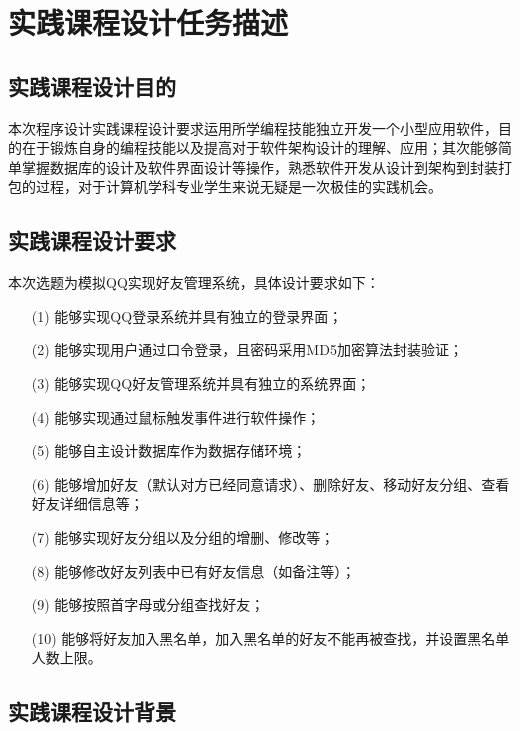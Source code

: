 \documentclass{progartcn}
\begin{document}
\clearpage
\thispagestyle{empty}
\tableofcontents  %
\newpage


\section{实践课程设计任务描述}
\subsection{实践课程设计目的}
本次程序设计实践课程设计要求运用所学编程技能独立开发一个小型应用软件，目的在于锻炼自身的编程技能以及提高对于软件架构设计的理解、应用；其次能够简单掌握数据库的设计及软件界面设计等操作，熟悉软件开发从设计到架构到封装打包的过程，对于计算机学科专业学生来说无疑是一次极佳的实践机会。

\subsection{实践课程设计要求}

本次选题为模拟QQ实现好友管理系统，具体设计要求如下：
\begin{enumerate}[itemsep=0.01pt]
	\item[(1)] 能够实现QQ登录系统并具有独立的登录界面；
	\item[(2)] 能够实现用户通过口令登录，且密码采用MD5加密算法封装验证；
	\item[(3)] 能够实现QQ好友管理系统并具有独立的系统界面；
	\item[(4)] 能够实现通过鼠标触发事件进行软件操作；
	\item[(5)] 能够自主设计数据库作为数据存储环境；
	\item[(6)] 能够增加好友（默认对方已经同意请求）、删除好友、移动好友分组、查看好友详细信息等；
	\item[(7)] 能够实现好友分组以及分组的增删、修改等；
	\item[(8)] 能够修改好友列表中已有好友信息（如备注等）；
	\item[(9)] 能够按照首字母或分组查找好友；
	\item[(10)] 能够将好友加入黑名单，加入黑名单的好友不能再被查找，并设置黑名单人数上限。
\end{enumerate}

\subsection{实践课程设计背景}
\end{document}
